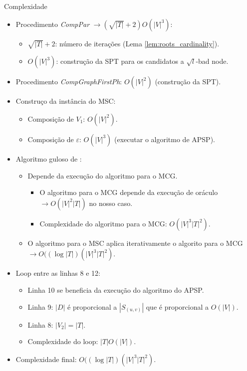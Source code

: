 \documentclass[10pt]{beamer}
\begin{document}
\begin{frame}{Complexidade \hyperlink{comp_approx}{}}
\hypertarget{comp_approx_slide}{}
\begin{itemize}
  \item <2-> Procedimento \emph{CompPar} $\rightarrow (\sqrt{|T|} + 2)O(|V|^3)$:
  \begin{itemize}
    \item $\sqrt{|T|} + 2$: número de iterações (Lema \ref{lem:roots_cardinality}).
    \item $O(|V|^3)$: construção da SPT para os candidatos a $\sqrt{l}$-bad node.
  \end{itemize}
  \item <3-> Procedimento \emph{CompGraphFirstPh}: $O(|V|^2)$ (construção da SPT).
  \item <4-> Construço da instância do MSC:
  \begin{itemize}
    \item Composição de $V_1$: $O(|V|^2)$.
    \item Composição de $\varepsilon$: $O(|V|^3)$ (executar o algoritmo de APSP).
  \end{itemize}
  \item <5-> Algoritmo guloso de \cite{Chekuri2004}:
  \begin{itemize}
    \item Depende da execução do algoritmo para o MCG.
    \begin{itemize}
      \item O algoritmo para o MCG depende da execução de oráculo $\rightarrow O(|V|^2|T|)$ no nosso caso.
      \item Complexidade do algoritmo para o MCG: $O(|V|^3|T|^2)$.
    \end{itemize}
    \item O algoritmo para o MSC aplica iterativamente o algorito para o MCG $\rightarrow O((\log{|T|})(|V|^3|T|^2)$.
  \end{itemize}
  \item <6-> Loop entre as linhas 8 e 12:
  \begin{itemize}
    \item Linha 10 se beneficia da execução do algoritmo do APSP.
    \item Linha 9: $|D|$ é proporcional a $|S_{(u,v)}|$ que é proporcional a $O(|V|)$.
    \item Linha 8: $|V_2| = |T|$.
    \item Complexidade do loop: $|T|O(|V|)$.
  \end{itemize}
  \item <7-> Complexidade final: $O((\log{|T|})(|V|^3|T|^2)$.
\end{itemize}
\end{frame}
\end{document}
